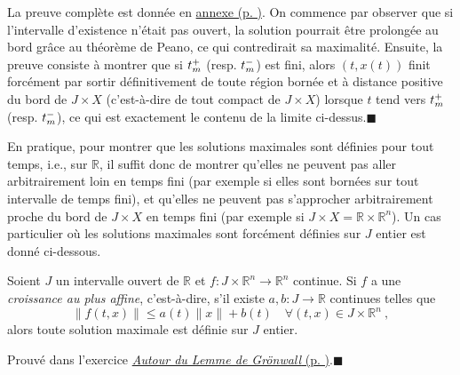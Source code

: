 \hypertarget{duxe9monstration-2}{}
\begin{preuve}\label{duxe9monstration-2}
La preuve complète est donnée en
\protect\hyperlink{pr_theo_bouts}{annexe (p. \pageref*{pr_theo_bouts})}.
On commence par observer que si l'intervalle d'existence n'était pas
ouvert, la solution pourrait être prolongée au bord grâce au théorème de
Peano, ce qui contredirait sa maximalité. Ensuite, la preuve consiste à
montrer que si \(t_m^+\) (resp. \(t_m^-\)) est fini, alors \((t,x(t))\)
finit forcément par sortir définitivement de toute région bornée et à
distance positive du bord de \(J\times X\) (c'est-à-dire de tout
compact de \(J\times X\)) lorsque \(t\) tend vers \(t_m^+\) (resp.
\(t_m^-\)), ce qui est exactement le contenu de la limite
ci-dessus.\hfill$\blacksquare$

En pratique, pour montrer que les solutions maximales sont définies pour
tout temps, i.e., sur \(\mathbb{R}\), il suffit donc de montrer qu'elles
ne peuvent pas aller arbitrairement loin en temps fini (par exemple si elles sont bornées
sur tout intervalle de temps fini), et qu'elles ne peuvent pas s'approcher arbitrairement proche du bord de \(J\times X\) en temps fini (par exemple si
\(J\times X= \mathbb{R}\times \mathbb{R}^n\)). Un cas particulier où les
solutions maximales sont forcément définies sur \(J\) entier est donné
ci-dessous.
\end{preuve}

\hypertarget{theo_exist_glob}{}
\begin{theoreme}\label{theo_exist_glob}
Soient \(J\) un intervalle ouvert de \(\mathbb{R}\) et
\(f:J\times\mathbb{R}^n\to\mathbb{R}^n\) continue. Si \(f\) a une
\emph{croissance au plus affine}, c'est-à-dire, s'il existe
\(a,b: J\to\mathbb{R}\) continues telles que
\[
\|f(t,x)\|\leq a(t) \|x\| + b(t) \quad \forall (t,x)\in J\times \mathbb{R}^n \ ,
\] alors toute solution maximale est définie sur \(J\) entier.
\end{theoreme}

\hypertarget{duxe9monstration-3}{}
\begin{preuve}\label{duxe9monstration-3}
Prouvé dans l'exercice \protect\hyperlink{exo_gronwall}{\emph{Autour du
Lemme de Grönwall} (p. \pageref*{exo_gronwall})}.\hfill$\blacksquare$
\end{preuve}

